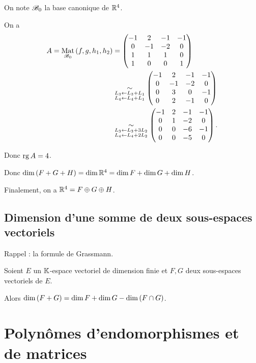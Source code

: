 \begin{corr}
On note \(\mathscr{B}_0\) la base canonique de \(\mathbb{R}^4\).

On a \[\begin{aligned}
A=\Mat[\fami{B}_0]{f,g,h_1,h_2}&=\begin{pmatrix}
-1 & 2 & -1 & -1 \\
0 & -1 & -2 & 0 \\
1 & 1 & 1 & 0 \\
1 & 0 & 0 & 1
\end{pmatrix} \\
&\simqd{\substack{L_3\gets L_3+L_1 \\ L_4\gets L_4+L_1}}\begin{pmatrix}
-1 & 2 & -1 & -1 \\
0 & -1 & -2 & 0 \\
0 & 3 & 0 & -1 \\
0 & 2 & -1 & 0
\end{pmatrix} \\
&\simqd{\substack{L_3\gets L_3+3L_2 \\ L_4\gets L_4+2L_2}}\begin{pmatrix}
-1 & 2 & -1 & -1 \\
0 & 1 & -2 & 0 \\
0 & 0 & -6 & -1 \\
0 & 0 & -5 & 0
\end{pmatrix}.
\end{aligned}\]

Donc \(\operatorname{rg} A=4\).

Donc \(\dim\left(F+G+H\right)=\dim\mathbb{R}^4=\dim F+\dim G+\dim H\).

Finalement, on a \(\mathbb{R}^4=F\oplus G\oplus H\).
\end{corr}

\subsection{Dimension d'une somme de deux sous-espaces vectoriels}

Rappel : la formule de Grassmann.

\begin{prop}
Soient \(E\) un \(\mathbb{K}\)-espace vectoriel de dimension finie et \(F,G\) deux sous-espaces vectoriels de \(E\).

Alors \(\dim\left(F+G\right)=\dim F+\dim G-\dim\left(F\cap G\right)\).
\end{prop}

\section{Polynômes d'endomorphismes et de matrices}

